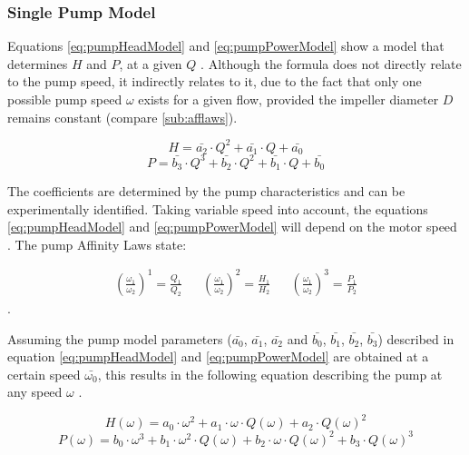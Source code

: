 \subsubsection{Single Pump Model}
Equations \ref{eq:pumpHeadModel} and \ref{eq:pumpPowerModel} show a model that 
determines $H$ and $P$,
at a given $Q$ \cite{Yang2010}. 
Although the formula does not directly relate to the pump speed, it indirectly relates to it,
due to the fact that only one possible pump speed $\omega$ exists for a given flow,
provided the impeller diameter $D$ remains constant (compare \ref{sub:afflaws}).


\begin{equation}
	H = \bar{a_{2}} \cdot Q^2 + \bar{a_{1}} \cdot Q + \bar{a_{0}}
	\label{eq:pumpHeadModel}
\end{equation}
\begin{equation}
	P = \bar{b_{3}} \cdot Q^3 + \bar{b_{2}} \cdot Q^2 + \bar{b_{1}} \cdot Q + \bar{b_{0}}
	\label{eq:pumpPowerModel}
\end{equation}

The coefficients are determined by the pump characteristics and can be experimentally identified.
Taking variable speed into account, the equations \ref{eq:pumpHeadModel}  and \ref{eq:pumpPowerModel}
will depend on the motor speed \cite{Yang2010}. The pump Affinity Laws state:

\begin{align*}
	\left(\frac{\omega_1}{\omega_2}\right)^1 = \frac{Q_1}{Q_2} && 
	\left(\frac{\omega_1}{\omega_2}\right)^2 = \frac{H_1}{H_2} &&
	\left(\frac{\omega_1}{\omega_2}\right)^3 = \frac{P_1}{P_2}		
\end{align*}\cite{Volk2014}.

Assuming the pump model parameters ($\bar{a_{0}}$, $\bar{a_{1}}$, $\bar{a_{2}}$ and $\bar{b_{0}}$,
$\bar{b_{1}}$, $\bar{b_{2}}$, $\bar{b_{3}}$) described in equation \ref{eq:pumpHeadModel} and 
\ref{eq:pumpPowerModel} are obtained at a certain speed $\bar{\omega_{0}}$, 
this results in the following equation describing the pump at any speed $\omega$ \cite{Yang2010}.

\begin{equation}
	H(\omega) = a_0 \cdot \omega^2 + a_1 \cdot \omega \cdot Q(\omega) + a_2 \cdot Q(\omega)^2
	\label{eq:pumpHeadModel2}
\end{equation}
\begin{equation}
	P(\omega) = b_0 \cdot \omega^3 + b_1 \cdot \omega^2 \cdot Q(\omega) + b_2 \cdot \omega \cdot Q(\omega)^2 + b_3 \cdot Q(\omega)^3
	\label{eq:pumpPowerModel2}
\end{equation}

